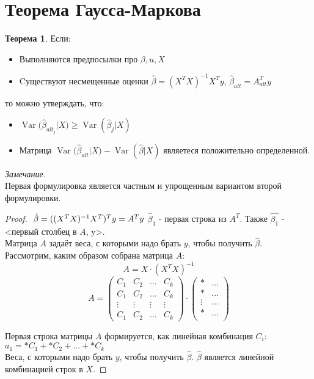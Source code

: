 \documentclass[12pt]{article} %
\theoremstyle{definition} %
\newtheorem{theorem}{Теорема}[section]
\DeclareMathOperator{\Var}{Var}
\begin{document}
\section{Теорема Гаусса-Маркова}

\begin{theorem}
Если:
\begin{itemize}
    \item Выполняются предпосылки про $\beta,u,X$
    \item Cуществуют несмещенные оценки   $\hat{\beta}=(X^TX)^{-1}X^Ty$, \enspace $\hat{\beta}_{alt}=A_{alt}^Ty$
\end{itemize}
то можно утверждать, что:
\begin{itemize}
    \item $\Var({\hat{\beta}_{alt_j}|X)} \geq{\Var(\hat{\beta}_j|X)}$
    \item Матрица $\Var({\hat{\beta}_{alt}|X)}-\Var(\hat{\beta}|X)$ являетеся положительно определенной.
\end{itemize}
\textit{Замечание.}\\
Первая формулировка является частным и упрощенным вариантом второй формулировки.
\begin{proof}
$ $\newline
$\hat{\beta}=((X^TX)^{-1}X^T)^Ty=A^Ty\\$
$\hat{\beta}_1$ - первая строка из $A^T$. Также
$\hat{\beta_1}$ - <первый столбец в $A$,  y>.\\
Матрица $A$ задаёт веса, с которыми надо брать $y$, чтобы получить $\hat{\beta}$.\\
Рассмотрим, каким образом собрана матрица $A$:
\[
A=X\cdot(X^TX)^{-1}
\]
\[A=
\begin{pmatrix}
C_1 & C_2 & \dots &C_k\\
C_1 & C_2 & \dots & C_k\\
\vdots & \vdots & \vdots &\vdots\\
C_1 & C_2 & \dots & C_k
\end{pmatrix} 
\cdot
\begin{pmatrix}
* & \dots \\
* & \dots \\
\vdots &\dots\\
* & \dots \\
\end{pmatrix} 
\]

Первая строка матрицы $A$ формируется, как линейная комбинация $C_i$: \\
$a_1=*C_1+*C_2+...+*C_k$
\\
Веса, с которыми надо брать $y$, чтобы получить $\hat{\beta}$. $\hat{\beta}$ является линейной комбинацией строк в $X$.


\end{proof}
\end{theorem}
\end{document}
